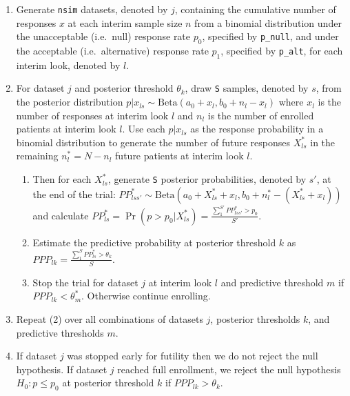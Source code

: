 \begin{enumerate}
\def\labelenumi{\arabic{enumi}.}
\item
  Generate \texttt{nsim} datasets, denoted by \(j\), containing the
  cumulative number of responses \(x\) at each interim sample size \(n\)
  from a binomial distribution under the unacceptable (i.e.~null)
  response rate \(p_0\), specified by \texttt{p\_null}, and under the
  acceptable (i.e.~alternative) response rate \(p_1\), specified by
  \texttt{p\_alt}, for each interim look, denoted by \(l\).
\item
  For dataset \(j\) and posterior threshold \(\theta_k\), draw
  \texttt{S} samples, denoted by \(s\), from the posterior distribution
  \(p|x_{ls} \sim \mbox{Beta}(a_0 + x_l, b_0 + n_l - x_l)\) where
  \(x_l\) is the number of responses at interim look \(l\) and \(n_l\)
  is the number of enrolled patients at interim look \(l\). Use each
  \(p|x_{ls}\) as the response probability in a binomial distribution to
  generate the number of future responses \(X^*_{ls}\) in the remaining
  \(n^*_l=N-n_l\) future patients at interim look \(l\).

  \begin{enumerate}
  \def\labelenumii{\alph{enumii}.}
  \tightlist
  \item
    Then for each \(X^*_{ls}\), generate \texttt{S} posterior
    probabilities, denoted by \(s'\), at the end of the trial:
    \(PP^*_{lss'} \sim \mbox{Beta}(a_0 + X^*_{ls} + x_l, b_0 + n^*_l - (X^*_{ls} + x_l))\)
    and calculate
    \(PP^*_{ls} = \Pr(p>p_0 | X^*_{ls}) = \frac{\sum_1^{S'} PP^*_{lss'} > p_0}{S'}\).
  \item
    Estimate the predictive probability at posterior threshold \(k\) as
    \(PPP_{lk} = \frac{\sum_1^S PP^*_{ls}>\theta_k}{S}\).
  \item
    Stop the trial for dataset \(j\) at interim look \(l\) and
    predictive threshold \(m\) if \(PPP_{lk} < \theta^*_m\). Otherwise
    continue enrolling.
  \end{enumerate}
\item
  Repeat (2) over all combinations of datasets \(j\), posterior
  thresholds \(k\), and predictive thresholds \(m\).
\item
  If dataset \(j\) was stopped early for futility then we do not reject
  the null hypothesis. If dataset \(j\) reached full enrollment, we
  reject the null hypothesis \(H_0: p \leq p_0\) at posterior threshold
  \(k\) if \(PPP_{lk} > \theta_k\).
\end{enumerate}

